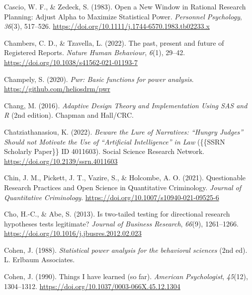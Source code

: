 \documentclass[
  oneside]{krantz}
\newlength{\cslhangindent}
\newlength{\cslentryspacingunit} %
\newenvironment{CSLReferences}[2] %
 {%
  \setlength{\parindent}{0pt}
  \ifodd #1
  \let\oldpar\par
  \def\par{\hangindent=\cslhangindent\oldpar}
  \fi
  \setlength{\parskip}{#2\cslentryspacingunit}
 }%
 {}
\begin{document}
\begin{CSLReferences}{1}{0}
\leavevmode{}%
Cascio, W. F., \& Zedeck, S. (1983). Open a {New Window} in {Rational
Research Planning}: {Adjust Alpha} to {Maximize Statistical Power}.
\emph{Personnel Psychology}, \emph{36}(3), 517--526.
\url{https://doi.org/10.1111/j.1744-6570.1983.tb02233.x}

\leavevmode{}%
Chambers, C. D., \& Tzavella, L. (2022). The past, present and future of
{Registered Reports}. \emph{Nature Human Behaviour}, \emph{6}(1),
29--42. \url{https://doi.org/10.1038/s41562-021-01193-7}

\leavevmode{}%
Champely, S. (2020). \emph{Pwr: Basic functions for power analysis}.
\url{https://github.com/heliosdrm/pwr}

\leavevmode{}%
Chang, M. (2016). \emph{Adaptive {Design Theory} and {Implementation
Using SAS} and {R}} (2nd edition). {Chapman and Hall/CRC}.

\leavevmode{}%
Chatziathanasiou, K. (2022). \emph{Beware the {Lure} of {Narratives}:
{``{Hungry Judges}''} {Should} not {Motivate} the {Use} of
{``{Artificial Intelligence}''} in {Law}} (\{\{SSRN Scholarly Paper\}\}
ID 4011603). {Social Science Research Network}.
\url{https://doi.org/10.2139/ssrn.4011603}

\leavevmode{}%
Chin, J. M., Pickett, J. T., Vazire, S., \& Holcombe, A. O. (2021).
Questionable {Research Practices} and {Open Science} in {Quantitative
Criminology}. \emph{Journal of Quantitative Criminology}.
\url{https://doi.org/10.1007/s10940-021-09525-6}

\leavevmode{}%
Cho, H.-C., \& Abe, S. (2013). Is two-tailed testing for directional
research hypotheses tests legitimate? \emph{Journal of Business
Research}, \emph{66}(9), 1261--1266.
\url{https://doi.org/10.1016/j.jbusres.2012.02.023}

\leavevmode{}%
Cohen, J. (1988). \emph{Statistical power analysis for the behavioral
sciences} (2nd ed). {L. Erlbaum Associates}.

\leavevmode{}%
Cohen, J. (1990). Things {I} have learned (so far). \emph{American
Psychologist}, \emph{45}(12), 1304--1312.
\url{https://doi.org/10.1037/0003-066X.45.12.1304}


\end{CSLReferences}
\end{document}
